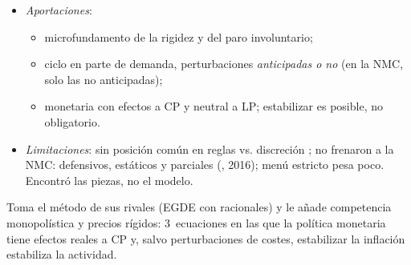\documentclass{article}
\begin{document}
\begin{columnas}
\begin{itemize}
\item \emph{Aportaciones}:
  \begin{itemize}
  \item microfundamento de la rigidez y del paro involuntario;
  \item ciclo en parte de demanda, perturbaciones \emph{anticipadas o no} (en la NMC, solo las no anticipadas);
  \item monetaria con efectos a CP y neutral a LP; estabilizar es posible, no obligatorio.
  \end{itemize}
\item \emph{Limitaciones}: sin posición común en reglas vs. discreción ; no frenaron a la NMC: defensivos, estáticos y parciales (, 2016); menú estricto pesa poco. Encontró las piezas, no el modelo.
\end{itemize}

\begin{ideaclave}
Toma el método de sus rivales (EGDE con racionales) y le añade competencia monopolística y precios rígidos: 3~ecuaciones en las que la política monetaria tiene efectos reales a CP y, salvo perturbaciones de costes, estabilizar la inflación estabiliza la actividad.
\end{ideaclave}


\end{columnas}
\end{document}
